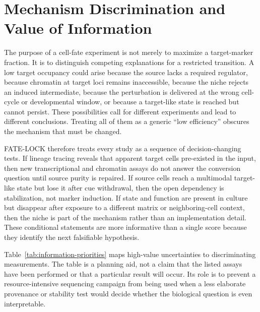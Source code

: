 \documentclass[10pt,conference]{IEEEtran}
\begin{document}
\section{Mechanism Discrimination and Value of Information}
\label{sec:decision-ladder}

The purpose of a cell-fate experiment is not merely to maximize a target-marker fraction. It is to distinguish competing explanations for a restricted transition. A low target occupancy could arise because the source lacks a required regulator, because chromatin at target loci remains inaccessible, because the niche rejects an induced intermediate, because the perturbation is delivered at the wrong cell-cycle or developmental window, or because a target-like state is reached but cannot persist. These possibilities call for different experiments and lead to different conclusions. Treating all of them as a generic ``low efficiency'' obscures the mechanism that must be changed.

FATE-LOCK therefore treats every study as a sequence of decision-changing tests. If lineage tracing reveals that apparent target cells pre-existed in the input, then new transcriptional and chromatin assays do not answer the conversion question until source purity is repaired. If source cells reach a multimodal target-like state but lose it after cue withdrawal, then the open dependency is stabilization, not marker induction. If state and function are present in culture but disappear after exposure to a different matrix or neighboring-cell context, then the niche is part of the mechanism rather than an implementation detail. These conditional statements are more informative than a single score because they identify the next falsifiable hypothesis.

Table~\ref{tab:information-priorities} maps high-value uncertainties to discriminating measurements. The table is a planning aid, not a claim that the listed assays have been performed or that a particular result will occur. Its role is to prevent a resource-intensive sequencing campaign from being used when a less elaborate provenance or stability test would decide whether the biological question is even interpretable.
\end{document}

